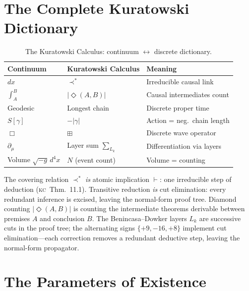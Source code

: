 \documentclass[11pt, a4paper, openany]{book}
\newcommand{\covers}{\prec^*}              %
\newcommand{\diam}[2]{|\Diamond(#1,#2)|}   %
\newcommand{\boxlayer}{\boxplus}            %
\newcommand{\KC}[1]{\textnormal{(\textsc{kc}~#1)}}
\begin{document}
\section{The Complete Kuratowski Dictionary}\label{sec:dictionary}

\begin{table}[H]
\centering
\caption{The Kuratowski Calculus: continuum $\longleftrightarrow$ discrete dictionary.}
\label{tab:kuratowski}
\begin{tabular}{@{}lll@{}}
\toprule
\textbf{Continuum} & \textbf{Kuratowski Calculus} & \textbf{Meaning} \\
\midrule
$dx$                        & $\covers$                       & Irreducible causal link \\
$\displaystyle\int_A^B$     & $\diam{A}{B}$                   & Causal intermediates count \\
Geodesic                    & Longest chain                   & Discrete proper time \\
$S[\gamma]$                 & $-|\gamma|$                     & Action = neg.\ chain length \\
$\Box$                      & $\boxlayer$                     & Discrete wave operator \\
$\partial_\mu$              & Layer sum $\sum_{L_k}$          & Differentiation via layers \\
Volume $\sqrt{-g}\,d^4x$    & $N$ (event count)               & Volume = counting \\
\bottomrule
\end{tabular}
\end{table}

\begin{logicalreading}
The covering relation $\covers$ \emph{is} atomic implication $\vdash$:
one irreducible step of deduction \KC{Thm.~11.1}. Transitive reduction
\emph{is} cut elimination: every redundant inference is excised, leaving
the normal-form proof tree. Diamond counting $\diam{A}{B}$ is counting
the intermediate theorems derivable between premises $A$ and conclusion
$B$. The Benincasa--Dowker layers $L_k$ are successive cuts in the proof
tree; the alternating signs $\{+9, -16, +8\}$ implement cut
elimination---each correction removes a redundant deductive step,
leaving the normal-form propagator.
\end{logicalreading}

\section{The Parameters of Existence}\label{sec:parameters-existence}
\end{document}
